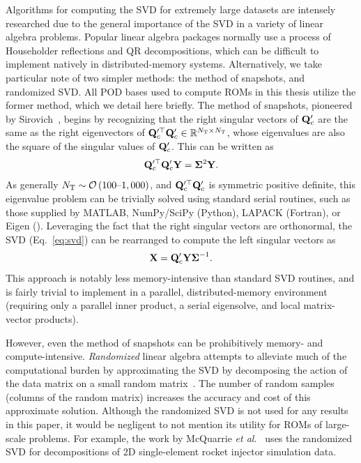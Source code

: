 Algorithms for computing the SVD for extremely large datasets are intensely researched due to the general importance of the SVD in a variety of linear algebra problems. Popular linear algebra packages normally use a process of Householder reflections and QR decompositions, which can be difficult to implement natively in distributed-memory systems. Alternatively, we take particular note of two simpler methods: the method of snapshots, and randomized SVD. All POD bases used to compute ROMs in this thesis utilize the former method, which we detail here briefly. The method of snapshots, pioneered by Sirovich~\cite{Sirovich1987}, begins by recognizing that the right singular vectors of $\consDataMatUns$ are the same as the right eigenvectors of $\consDataMatUns^\top \consDataMatUns \inRTwo{\numSnaps}{\numSnaps}$, whose eigenvalues are also the square of the singular values of $\consDataMatUns$. This can be written as
%
\begin{equation}
	\consDataMatUns^\top \consDataMatUns \rightEvecMat = \singVecMat^2 \rightEvecMat.
\end{equation}
%
As generally $N_{\text{T}}\sim\mathcal{O}\left(100\text{--}1,000\right)$, and $\consDataMatUns^\top \consDataMatUns$ is symmetric positive definite, this eigenvalue problem can be trivially solved using standard serial routines, such as those supplied by MATLAB, NumPy/SciPy (Python), LAPACK (Fortran), or Eigen (\CC). Leveraging the fact that the right singular vectors are orthonormal, the SVD (Eq.~\ref{eq:svd}) can be rearranged to compute the left singular vectors as
%
\begin{equation}
	\leftEvecMat = \consDataMatUns \rightEvecMat \singVecMat^{-1}.
\end{equation}
%
This approach is notably less memory-intensive than standard SVD routines, and is fairly trivial to implement in a parallel, distributed-memory environment (requiring only a parallel inner product, a serial eigensolve, and local matrix-vector products).

However, even the method of snapshots can be prohibitively memory- and compute-intensive. \textit{Randomized} linear algebra attempts to alleviate much of the computational burden by approximating the SVD by decomposing the action of the data matrix on a small random matrix~\cite{Halko2011}. The number of random samples (columns of the random matrix) increases the accuracy and cost of this approximate solution. Although the randomized SVD is not used for any results in this paper, it would be negligent to not mention its utility for ROMs of large-scale problems. For example, the work by McQuarrie \textit{et al.}~\cite{McQuarrie2021} uses the randomized SVD for decompositions of 2D single-element rocket injector simulation data.


